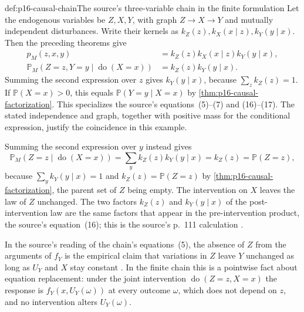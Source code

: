 \begin{hbexample}{def:p16-causal-chain}{The source's three-variable chain in the finite formulation}
Let the endogenous variables be \(Z,X,Y\), with graph
\(Z\to X\to Y\) and mutually independent disturbances. Write their
kernels as \(k_Z(z),k_X(x\mid z),k_Y(y\mid x)\).
Then the preceding theorems give
\[
\begin{aligned}
 p_M(z,x,y)&=k_Z(z)k_X(x\mid z)k_Y(y\mid x),\\
 \mathbb P_M(Z=z,Y=y\mid\operatorname{do}(X=x))
     &=k_Z(z)k_Y(y\mid x).
\end{aligned}
\]
Summing the second expression over \(z\) gives \(k_Y(y\mid x)\),
because \(\sum_z k_Z(z)=1\). If \(\mathbb P(X=x)>0\), this equals
\(\mathbb P(Y=y\mid X=x)\) by
\cref{thm:p16-causal-factorization}. This specializes the source's
equations~(5)--(7) and (16)--(17). The stated independence and graph,
together with positive mass for the conditional expression, justify the
coincidence in this example.

Summing the second expression over \(y\) instead gives
\[
 \mathbb P_M(Z=z\mid\operatorname{do}(X=x))
 =\sum_y k_Z(z)k_Y(y\mid x)=k_Z(z)=\mathbb P(Z=z),
\]
because \(\sum_yk_Y(y\mid x)=1\) and \(k_Z(z)=\mathbb P(Z=z)\) by
\cref{thm:p16-causal-factorization}, the parent set of \(Z\) being
empty. The intervention on \(X\) leaves the law of \(Z\) unchanged.
The two factors \(k_Z(z)\) and \(k_Y(y\mid x)\) of the post-intervention
law are the same factors that appear in the pre-intervention product,
the source's equation~(16); this is the source's p.~111 calculation
\cite[sec.~3.2.3, p.~111]{Pearl2009CausalOverview}.

In the source's reading of the chain's equations~(5), the absence of
\(Z\) from the arguments of \(f_Y\) is the empirical claim that variations
in \(Z\) leave \(Y\) unchanged as long as \(U_Y\) and \(X\) stay constant
\cite[sec.~3.2, p.~107]{Pearl2009CausalOverview}. In the finite chain
this is a pointwise fact about equation replacement: under the joint
intervention \(\operatorname{do}(Z=z,X=x)\) the response is
\(f_Y(x,U_Y(\omega))\) at every outcome \(\omega\), which does not depend
on \(z\), and no intervention alters \(U_Y(\omega)\).
\end{hbexample}

